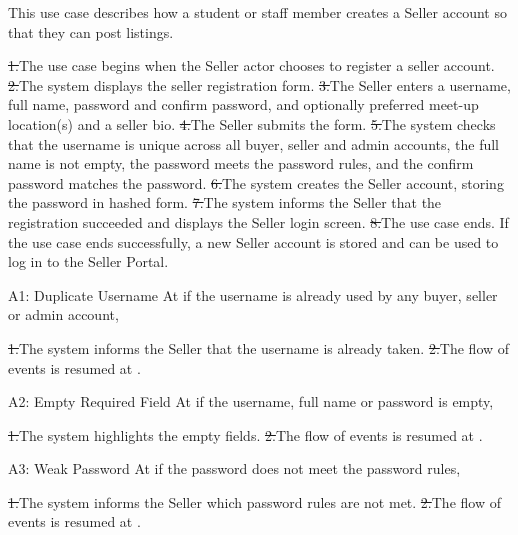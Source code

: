 

\clearpage
{}
This use case describes how a student or staff member creates a Seller account so that they can post listings.\par
{}
\st{1.}{The use case begins when the Seller actor chooses to register a seller account.}
\st{2.}{The system displays the seller registration form.}
\st{3.}{The Seller enters a username, full name, password and confirm password, and optionally preferred meet-up location(s) and a seller bio.}
\st{4.}{The Seller submits the form.}
\st{5.}{The system checks that the username is unique across all buyer, seller and admin accounts, the full name is not empty, the password meets the password rules, and the confirm password matches the password.}
\st{6.}{The system creates the Seller account, storing the password in hashed form.}
\st{7.}{The system informs the Seller that the registration succeeded and displays the Seller login screen.}
\st{8.}{The use case ends.}
If the use case ends successfully, a new Seller account is stored and can be used to log in to the Seller Portal.\par
{}
\begin{flowblock}{A1: Duplicate Username}
At  if the username is already used by any buyer, seller or admin account,\par
\st{1.}{The system informs the Seller that the username is already taken.}
\st{2.}{The flow of events is resumed at .}
\end{flowblock}
\begin{flowblock}{A2: Empty Required Field}
At  if the username, full name or password is empty,\par
\st{1.}{The system highlights the empty fields.}
\st{2.}{The flow of events is resumed at .}
\end{flowblock}
\begin{flowblock}{A3: Weak Password}
At  if the password does not meet the password rules,\par
\st{1.}{The system informs the Seller which password rules are not met.}
\st{2.}{The flow of events is resumed at .}
\end{flowblock}
